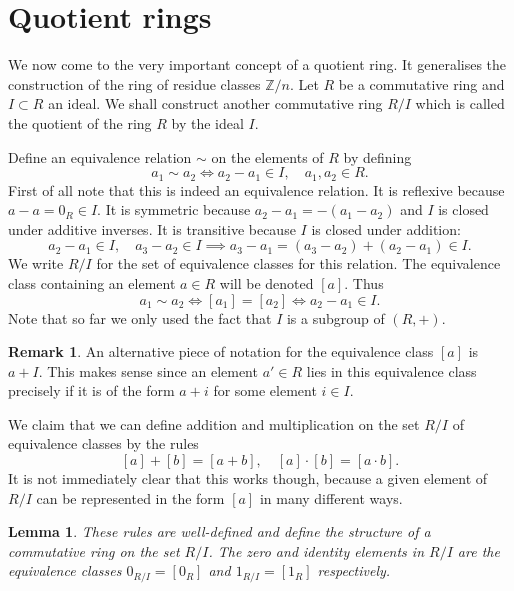 \documentclass [12pt,oneside,a4paper,mathscr]{amsart}
\newtheorem{lemma}[thm]{Lemma}
\theoremstyle{definition}
\newtheorem{remark}[thm]{Remark}
\newcommand{\Z}{\mathbb Z}
\begin{document}



\section{Quotient rings}



We now come to  the very important concept of a quotient ring. It generalises the construction of the ring of residue classes $\Z/n$.
Let $R$ be a commutative ring and $I\subset R$ an ideal. We shall construct another  commutative ring $R/I$ which is called the quotient of the ring $R$ by the ideal $I$.

Define an equivalence relation $\sim$ on the elements of $R$ by defining
\[a_1\sim a_2 \iff a_2-a_1\in I, \quad a_1,a_2\in R.\]
First of all note that this is indeed an equivalence relation. It is reflexive because $a-a=0_R\in I$. It is symmetric because $a_2-a_1=-(a_1-a_2)$ and $I$ is closed under additive inverses. It is transitive because $I$ is closed under addition:
\[a_2-a_1\in I, \quad a_3-a_2\in I \implies a_3-a_1=(a_3-a_2)+(a_2-a_1)\in I.\]
We write $R/I$ for the set of equivalence classes for this relation.
The equivalence class containing an element $a\in R$ will be denoted $[a]$. Thus
\[ a_1\sim a_2  \iff [a_1]=[a_2] \iff a_2-a_1\in I.\]
Note that so far we only used the fact that $I$ is a subgroup of $(R,+)$. 

\begin{remark}
An alternative piece of notation for the equivalence class $[a]$ is $a+I$. 
This makes sense since an element $a'\in R$ lies in this equivalence class precisely if it is of the form $a+i$ for some element $i\in I$.
\end{remark}

We claim that we can define addition and multiplication on the set $R/I$ of  equivalence classes by the rules
\[[a]+[b]=[a+b], \quad [a]\cdot [b]=[a\cdot b].\]
It is not immediately clear that this works though, because 
a given element of $R/I$ can be represented in the form $[a]$ in many different ways.

\begin{lemma}
These rules are well-defined and define the structure of a commutative ring  on the set $R/I$. The zero and identity elements in $R/I$ are the equivalence classes $0_{R/I}=[0_R]$ and $1_{R/I}=[ 1_R]$ respectively.
\end{lemma}
\end{document}
